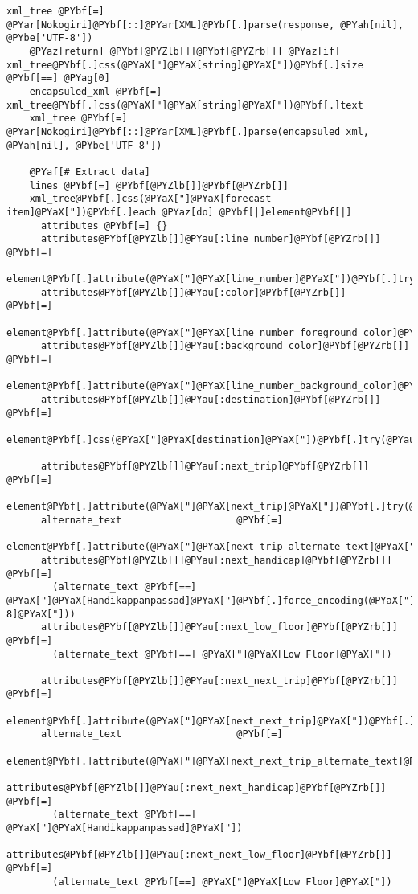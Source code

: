 \begin{Verbatim}[commandchars=@\[\]]
    xml_tree @PYbf[=] @PYar[Nokogiri]@PYbf[::]@PYar[XML]@PYbf[.]parse(response, @PYah[nil], @PYbe['UTF-8'])
    @PYaz[return] @PYbf[@PYZlb[]]@PYbf[@PYZrb[]] @PYaz[if] xml_tree@PYbf[.]css(@PYaX["]@PYaX[string]@PYaX["])@PYbf[.]size @PYbf[==] @PYag[0]
    encapsuled_xml @PYbf[=] xml_tree@PYbf[.]css(@PYaX["]@PYaX[string]@PYaX["])@PYbf[.]text
    xml_tree @PYbf[=] @PYar[Nokogiri]@PYbf[::]@PYar[XML]@PYbf[.]parse(encapsuled_xml, @PYah[nil], @PYbe['UTF-8'])
    
    @PYaf[# Extract data]
    lines @PYbf[=] @PYbf[@PYZlb[]]@PYbf[@PYZrb[]]
    xml_tree@PYbf[.]css(@PYaX["]@PYaX[forecast item]@PYaX["])@PYbf[.]each @PYaz[do] @PYbf[|]element@PYbf[|]
      attributes @PYbf[=] {}
      attributes@PYbf[@PYZlb[]]@PYau[:line_number]@PYbf[@PYZrb[]]          @PYbf[=]
        element@PYbf[.]attribute(@PYaX["]@PYaX[line_number]@PYaX["])@PYbf[.]try(@PYau[:text])@PYbf[.]to_s
      attributes@PYbf[@PYZlb[]]@PYau[:color]@PYbf[@PYZrb[]]                @PYbf[=]
        element@PYbf[.]attribute(@PYaX["]@PYaX[line_number_foreground_color]@PYaX["])@PYbf[.]try(@PYau[:text])@PYbf[.]to_s
      attributes@PYbf[@PYZlb[]]@PYau[:background_color]@PYbf[@PYZrb[]]     @PYbf[=]
        element@PYbf[.]attribute(@PYaX["]@PYaX[line_number_background_color]@PYaX["])@PYbf[.]try(@PYau[:text])@PYbf[.]to_s
      attributes@PYbf[@PYZlb[]]@PYau[:destination]@PYbf[@PYZrb[]]          @PYbf[=]
        element@PYbf[.]css(@PYaX["]@PYaX[destination]@PYaX["])@PYbf[.]try(@PYau[:text])@PYbf[.]to_s
      
      attributes@PYbf[@PYZlb[]]@PYau[:next_trip]@PYbf[@PYZrb[]]            @PYbf[=]
        element@PYbf[.]attribute(@PYaX["]@PYaX[next_trip]@PYaX["])@PYbf[.]try(@PYau[:text])@PYbf[.]to_s
      alternate_text                    @PYbf[=]
        element@PYbf[.]attribute(@PYaX["]@PYaX[next_trip_alternate_text]@PYaX["])@PYbf[.]try(@PYau[:text])@PYbf[.]to_s
      attributes@PYbf[@PYZlb[]]@PYau[:next_handicap]@PYbf[@PYZrb[]]        @PYbf[=]
        (alternate_text @PYbf[==] @PYaX["]@PYaX[Handikappanpassad]@PYaX["]@PYbf[.]force_encoding(@PYaX["]@PYaX[UTF-8]@PYaX["])) 
      attributes@PYbf[@PYZlb[]]@PYau[:next_low_floor]@PYbf[@PYZrb[]]       @PYbf[=]
        (alternate_text @PYbf[==] @PYaX["]@PYaX[Low Floor]@PYaX["])
      
      attributes@PYbf[@PYZlb[]]@PYau[:next_next_trip]@PYbf[@PYZrb[]]       @PYbf[=]
        element@PYbf[.]attribute(@PYaX["]@PYaX[next_next_trip]@PYaX["])@PYbf[.]try(@PYau[:text])@PYbf[.]to_s
      alternate_text                    @PYbf[=]
       element@PYbf[.]attribute(@PYaX["]@PYaX[next_next_trip_alternate_text]@PYaX["])@PYbf[.]try(@PYau[:text])@PYbf[.]to_s
      attributes@PYbf[@PYZlb[]]@PYau[:next_next_handicap]@PYbf[@PYZrb[]]   @PYbf[=]
        (alternate_text @PYbf[==] @PYaX["]@PYaX[Handikappanpassad]@PYaX["])
      attributes@PYbf[@PYZlb[]]@PYau[:next_next_low_floor]@PYbf[@PYZrb[]]  @PYbf[=]
        (alternate_text @PYbf[==] @PYaX["]@PYaX[Low Floor]@PYaX["])


\end{Verbatim}
